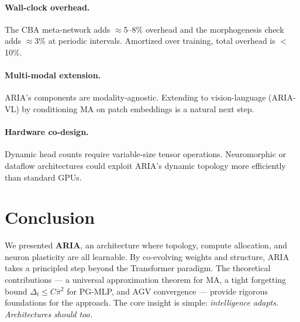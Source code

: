 \documentclass[11pt,a4paper]{article}
\theoremstyle{plain}
\theoremstyle{definition}
\theoremstyle{remark}
\newcommand{\pibar}{\bar{\pi}}
\begin{document}
\paragraph{Wall-clock overhead.} The CBA meta-network adds $\approx$5--8\% overhead and the morphogenesis check adds $\approx$3\% at periodic intervals. Amortized over training, total overhead is $<$10\%.

\paragraph{Multi-modal extension.} ARIA's components are modality-agnostic. Extending to vision-language (ARIA-VL) by conditioning MA on patch embeddings is a natural next step.

\paragraph{Hardware co-design.} Dynamic head counts require variable-size tensor operations. Neuromorphic or dataflow architectures could exploit ARIA's dynamic topology more efficiently than standard GPUs.

\section{Conclusion}

We presented \textbf{ARIA}, an architecture where topology, compute allocation, and neuron plasticity are all learnable. By co-evolving weights and structure, ARIA takes a principled step beyond the Transformer paradigm. The theoretical contributions --- a universal approximation theorem for MA, a tight forgetting bound $\Delta_t \leq C\pibar^2$ for PG-MLP, and AGV convergence --- provide rigorous foundations for the approach. The core insight is simple: \emph{intelligence adapts. Architectures should too.}
\end{document}
